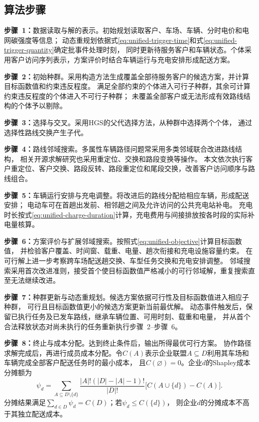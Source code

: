 \documentclass{setp-new}
\begin{document}
\subsection{算法步骤}

\textbf{步骤~1：}数据读取与解的表示。初始规划读取客户、车场、车辆、分时电价和电网碳强度等信息；
动态重规划依据式\eqref{eq:unified-trigger-time}和式\eqref{eq:unified-trigger-quantity}确定批事件处理时刻，
同时更新待服务客户和车辆状态。个体采用客户访问序列表示，方案评价时结合车辆运行与充电安排形成配送方案。

\textbf{步骤~2：}初始种群。采用构造方法生成覆盖全部待服务客户的候选方案，并计算目标函数值和约束违反程度。
满足全部约束的个体进入可行子种群，其余可计算约束违反程度的个体进入不可行子种群；
未覆盖全部客户或无法形成有效路线结构的个体予以剔除。

\textbf{步骤~3：}选择与交叉。采用HGS的父代选择方法，从种群中选择两个个体，
通过选择性路线交换产生子代\cite{ref:76}。

\textbf{步骤~4：}路线邻域搜索。多属性车辆路径问题常采用多类邻域联合改进路线结构\cite{ref:77}，
相关开源求解研究也采用重定位、交换和路段变换等操作\cite{ref:64}。
本文依次执行客户重定位、客户交换、路段反转、路段重定位和尾段交换，改善客户访问顺序与路线组合。

\textbf{步骤~5：}车辆运行安排与充电调整。将改进后的路线分配给相应车辆，形成配送安排；
电动车可在首趟出发前、相邻趟之间及允许访问的公共充电站补电。
充电时长按式\eqref{eq:unified-charge-duration}计算，充电费用与间接排放按各时段的实际补电量核算。

\textbf{步骤~6：}方案评价与扩展邻域搜索。按照式\eqref{eq:unified-objective}计算目标函数值，
并检验客户覆盖、时间窗、载重、电量、趟次衔接和充电设施容量约束。
在可行解上进一步考察跨车场配送趟交换、车型任务交换和充电安排调整。
邻域搜索采用首次改进准则，接受首个使目标函数值严格减小的可行邻域解，重复搜索直至无法继续改进。

\textbf{步骤~7：}种群更新与动态重规划。候选方案依据可行性及目标函数值进入相应子种群，
可行且目标函数值更小的候选方案更新当前最优解。
动态事件触发后，保留已执行任务及已发车路线，继承车辆位置、可用时刻、载重和电量，
并从首个合法释放状态对尚未执行的任务重新执行步骤~2--步骤~6。

\textbf{步骤~8：}终止与成本分配。达到终止条件后，输出所得最优可行方案。
协作路径求解完成后，再进行成员成本分配。令$C(A)$表示企业联盟$A\subseteq D$利用其车场和车辆完成全部客户配送任务时的最小成本，
且$C(\varnothing)=0$。企业$d$的Shapley成本分摊额为\cite{ref:91}
\begin{equation}
\psi_d=\sum_{A\subseteq D\setminus\{d\}}
\frac{|A|!(|D|-|A|-1)!}{|D|!}
\bigl[C(A\cup\{d\})-C(A)\bigr].
\label{eq:shapley-cost}
\end{equation}
分摊结果满足$\sum_{d\in D}\psi_d=C(D)$；若$\psi_d\le C(\{d\})$，
则企业$d$的分摊成本不高于其独立配送成本。
\end{document}

